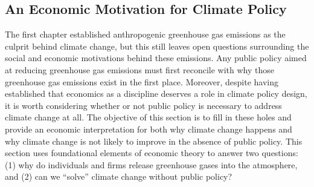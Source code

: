 \subsection{An Economic Motivation for Climate Policy}


The first chapter established anthropogenic greenhouse gas emissions as the culprit behind climate change, but this still leaves open questions surrounding the social and economic motivations behind these emissions. Any public policy aimed at reducing greenhouse gas emissions must first reconcile with why those greenhouse gas emissions exist in the first place. Moreover, despite having established that economics as a discipline deserves a role in climate policy design, it is worth considering whether or not public policy is necessary to address climate change at all. The objective of this section is to fill in these holes and provide an economic interpretation for both why climate change happens and why climate change is not likely to improve in the absence of public policy. This section uses foundational elements of economic theory to answer two questions: (1) why do individuals and firms release greenhouse gases into the atmosphere, and (2) can we ``solve'' climate change without public policy? 

